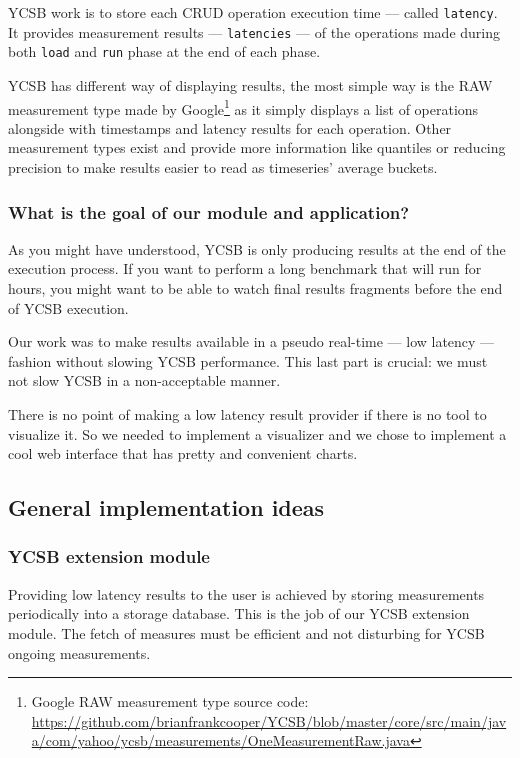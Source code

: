 \documentclass[a4paper,11pt]{report}
\begin{document}
YCSB work is to store each CRUD operation execution time --- called \texttt{latency}. It provides measurement results --- \texttt{latencies} --- of the operations made during both \texttt{load} and \texttt{run} phase at the end of each phase.

YCSB has different way of displaying results, the most simple way is the RAW measurement type made by Google\footnote{Google RAW measurement type source code: \url{https://github.com/brianfrankcooper/YCSB/blob/master/core/src/main/java/com/yahoo/ycsb/measurements/OneMeasurementRaw.java}} as it simply displays a list of operations alongside with timestamps and latency results for each operation. Other measurement types exist and provide more information like quantiles or reducing precision to make results easier to read as timeseries' average buckets.

\subsubsection{What is the goal of our module and application?}

As you might have understood, YCSB is only producing results at the end of the execution process. If you want to perform a long benchmark that will run for hours, you might want to be able to watch final results fragments before the end of YCSB execution.

\bigskip

Our work was to make results available in a pseudo real-time --- low latency --- fashion without slowing YCSB performance. This last part is crucial: we must not slow YCSB in a non-acceptable manner.

There is no point of making a low latency result provider if there is no tool to visualize it. So we needed to implement a visualizer and we chose to implement a cool web interface that has pretty and convenient charts.

\subsection{General implementation ideas}

\subsubsection{YCSB extension module}

Providing low latency results to the user is achieved by storing measurements periodically into a storage database. This is the job of our YCSB extension module. The fetch of measures must be efficient and not disturbing for YCSB ongoing measurements.
\end{document}
